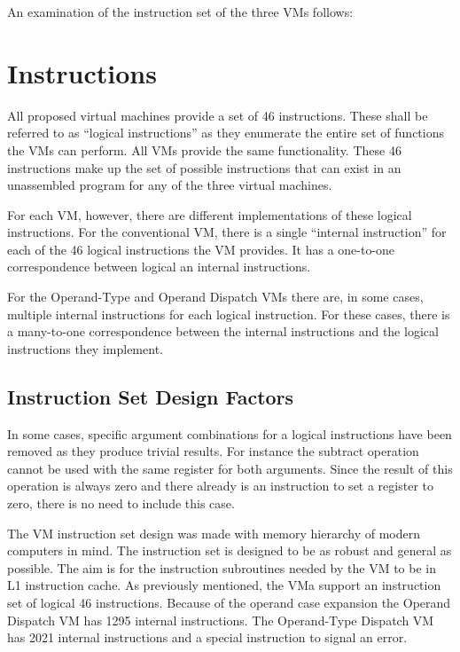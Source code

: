 \documentclass[english,a4paper,12pt]{report}
\begin{document}
An examination of the instruction set of the three VMs follows:

\section{Instructions}

All proposed virtual machines provide a set of 46 instructions. These
shall be referred to as ``logical instructions'' as they enumerate the
entire set of functions the VMs can perform. All VMs provide the same
functionality. These 46 instructions make up the set of possible
instructions that can exist in an unassembled program for any of the
three virtual machines. 

For each VM, however, there are different implementations of these
logical instructions. For the conventional VM, there is a single
``internal instruction'' for each of the 46 logical instructions the
VM provides. It has a one-to-one correspondence between logical an
internal instructions. 

For the Operand-Type and Operand Dispatch VMs there are, in some
cases, multiple internal instructions for each logical
instruction. For these cases, there is a many-to-one correspondence
between the internal instructions and the logical instructions they
implement.

\subsection{Instruction Set Design Factors}
\label{sec:inst-set-design-factors}
In some cases, specific argument combinations for a logical
instructions have been removed as they produce trivial results. For
instance the subtract operation cannot be used with the same register
for both arguments. Since the result of this operation is always zero
and there already is an instruction to set a register to zero, there
is no need to include this case.

The VM instruction set design was made with memory hierarchy of modern
computers in mind. The instruction set is designed to be as robust and
general as possible. The aim is for the instruction subroutines needed
by the VM to be in L1 instruction cache. As previously mentioned, the
VMa support an instruction set of logical 46 instructions. Because of
the operand case expansion the Operand Dispatch VM has 1295 internal
instructions. The Operand-Type Dispatch VM has 2021 internal
instructions and a special instruction to signal an error.
\end{document}
